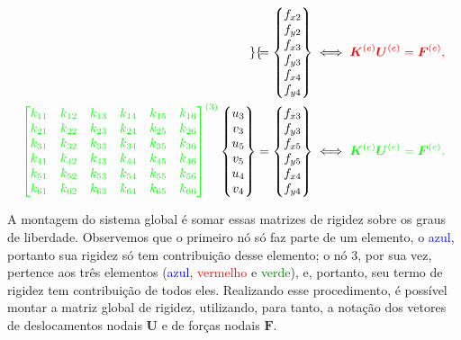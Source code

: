 \begin{align}
\begin{Bmatrix}
    \end{Bmatrix}
    &=
    \begin{Bmatrix}
        f_{x2} \\ f_{y2} \\ f_{x3} \\ f_{y3} \\ f_{x4} \\ f_{y4}
    \end{Bmatrix} \iff \color{red} \bm{K}^{(e)} \bm{U}^{(e)} = \bm{F}^{(e)}, \\
    \color{green} \begin{bmatrix}
        k_{11} & k_{12} & k_{13} & k_{14} & k_{15} & k_{16} \\
        k_{21} & k_{22} & k_{23} & k_{24} & k_{25} & k_{26} \\
        k_{31} & k_{32} & k_{33} & k_{34} & k_{35} & k_{36} \\
        k_{41} & k_{42} & k_{43} & k_{44} & k_{45} & k_{46} \\
        k_{51} & k_{52} & k_{53} & k_{54} & k_{55} & k_{56} \\
        k_{61} & k_{62} & k_{63} & k_{64} & k_{65} & k_{66} \\
    \end{bmatrix}^{(3)}
    \color{black}
    \begin{Bmatrix}
        u_3 \\ v_3 \\ u_5 \\ v_5 \\ u_4 \\ v_4
    \end{Bmatrix}
    &=
    \begin{Bmatrix}
        f_{x3} \\ f_{y3} \\ f_{x5} \\ f_{y5} \\ f_{x4} \\ f_{y4}
    \end{Bmatrix} \iff \color{green} \bm{K}^{(e)} \bm{U}^{(e)} = \bm{F}^{(e)}.
\end{align}

A montagem do sistema global é somar essas matrizes de rigidez sobre os graus de liberdade. Observemos que o primeiro nó só faz parte de um elemento, o \textcolor{blue}{azul}, portanto sua rigidez só tem contribuição desse elemento; o nó $3$, por sua vez, pertence aos três elementos (\textcolor{blue}{azul}, \textcolor{red}{vermelho} e \textcolor{green}{verde}), e, portanto, seu termo de rigidez tem contribuição de todos eles. Realizando esse procedimento, é possível montar a matriz global de rigidez, utilizando, para tanto, a notação dos vetores de deslocamentos nodais $\bm{U}$ e de forças nodais $\bm{F}$.

